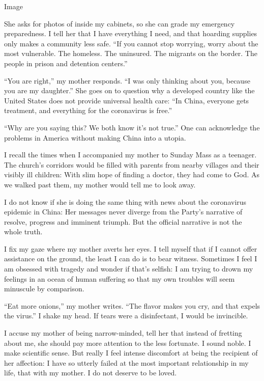 Image

She asks for photos of inside my cabinets, so she can grade my emergency
preparedness. I tell her that I have everything I need, and that
hoarding supplies only makes a community less safe. ``If you cannot stop
worrying, worry about the most vulnerable. The homeless. The uninsured.
The migrants on the border. The people in prison and detention
centers.''

``You are right,'' my mother responds. ``I was only thinking about you,
because you are my daughter.'' She goes on to question why a developed
country like the United States does not provide universal health care:
``In China, everyone gets treatment, and everything for the coronavirus
is free.''

``Why are you saying this? We both know it's not true.'' One can
acknowledge the problems in America without making China into a utopia.

I recall the times when I accompanied my mother to Sunday Mass as a
teenager. The church's corridors would be filled with parents from
nearby villages and their visibly ill children: With slim hope of
finding a doctor, they had come to God. As we walked past them, my
mother would tell me to look away.

I do not know if she is doing the same thing with news about the
coronavirus epidemic in China: Her messages never diverge from the
Party's narrative of resolve, progress and imminent triumph. But the
official narrative is not the whole truth.

I fix my gaze where my mother averts her eyes. I tell myself that if I
cannot offer assistance on the ground, the least I can do is to bear
witness. Sometimes I feel I am obsessed with tragedy and wonder if
that's selfish: I am trying to drown my feelings in an ocean of human
suffering so that my own troubles will seem minuscule by comparison.

``Eat more onions,'' my mother writes. ``The flavor makes you cry, and
that expels the virus.'' I shake my head. If tears were a disinfectant,
I would be invincible.

I accuse my mother of being narrow-minded, tell her that instead of
fretting about me, she should pay more attention to the less fortunate.
I sound noble. I make scientific sense. But really I feel intense
discomfort at being the recipient of her affection: I have so utterly
failed at the most important relationship in my life, that with my
mother. I do not deserve to be loved.

